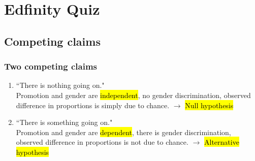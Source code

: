 \documentclass[slidestop,compress,mathserif]{beamer}
\newcommand{\soln}[1]{\textit{#1}}
\begin{document}










\section{Edfinity Quiz}

\subsection{Competing claims}


\begin{frame}
\frametitle{Two competing claims}

\begin{enumerate}

\item ``There is nothing going on." \\
Promotion and gender are \hl{independent}, no gender discrimination, observed difference in proportions is simply due to chance. $\rightarrow$ \hl{Null hypothesis}

\pause

\item ``There is something going on." \\
Promotion and gender are \hl{dependent}, there is gender discrimination, observed difference in proportions is not due to chance. $\rightarrow$ \hl{Alternative hypothesis}

\end{enumerate}

\end{frame}
\end{document}

